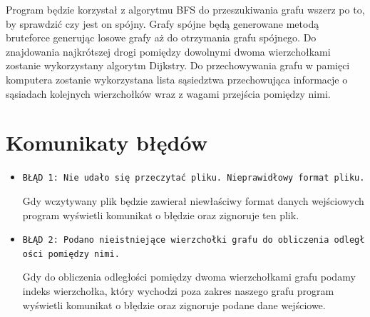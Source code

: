 \documentclass[]{article}
\begin{document}
Program będzie korzystał z algorytmu BFS do przeszukiwania grafu wszerz po to, by sprawdzić czy jest on spójny. Grafy spójne będą generowane metodą bruteforce generując losowe grafy aż do otrzymania grafu spójnego. Do znajdowania najkrótszej drogi pomiędzy dowolnymi dwoma wierzchołkami zostanie wykorzystany algorytm Dijkstry. Do przechowywania grafu w pamięci komputera zostanie wykorzystana lista sąsiedztwa przechowująca informacje o sąsiadach kolejnych wierzchołków wraz z wagami przejścia pomiędzy nimi. 



\section{Komunikaty błędów}\label{header-n281}

\begin{itemize}
\item
  \texttt{BŁĄD\ 1:\ Nie\ udało\ się\ przeczytać\ pliku.\ Nieprawidłowy\ format\ pliku.}

  Gdy wczytywany plik będzie zawierał niewłaściwy format danych wejściowych program wyświetli komunikat o błędzie oraz zignoruje ten plik.
\item
  \texttt{BŁĄD\ 2:\ Podano\ nieistniejące\ wierzchołki\ grafu\ do\ obliczenia\ odległości\ pomiędzy\ nimi.}

 Gdy do obliczenia odległości pomiędzy dwoma wierzchołkami grafu podamy indeks wierzchołka, który wychodzi poza zakres naszego grafu program wyświetli komunikat o błędzie oraz zignoruje podane dane wejściowe.


\end{itemize}
\end{document}
